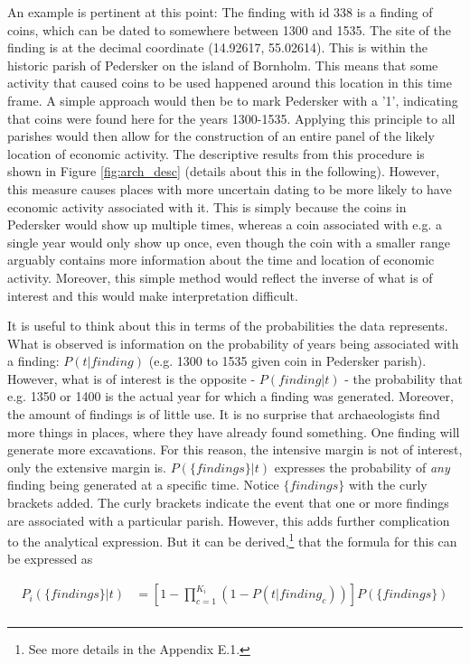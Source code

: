 \documentclass[11pt]{article}
\begin{document}
An example is pertinent at this point: The finding with id 338 is a finding of coins, which can be dated to somewhere between 1300 and 1535. The site of the finding is at the decimal coordinate (14.92617, 55.02614). This is within the historic parish of Pedersker on the island of Bornholm. This means that some activity that caused coins to be used happened around this location in this time frame. A simple approach would then be to mark Pedersker with a '1', indicating that coins were found here for the years 1300-1535. Applying this principle to all parishes would then allow for the construction of an entire panel of the likely location of economic activity. The descriptive results from this procedure is shown in Figure \ref{fig:arch_desc} (details about this in the following). However, this measure causes places with more uncertain dating to be more likely to have economic activity associated with it. This is simply because the coins in Pedersker would show up multiple times, whereas a coin associated with e.g. a single year would only show up once, even though the coin with a smaller range arguably contains more information about the time and location of economic activity. Moreover, this simple method would reflect the inverse of what is of interest and this would make interpretation difficult. 

It is useful to think about this in terms of the probabilities the data represents. What is observed is information on the probability of years being associated with a finding: $P(t|finding)$ (e.g. 1300 to 1535 given coin in Pedersker parish). However, what is of interest is the opposite - $P(finding|t)$ - the probability that e.g. 1350 or 1400 is the actual year for which a finding was generated. Moreover, the amount of findings is of little use. It is no surprise that archaeologists find more things in places, where they have already found something. One finding will generate more excavations. For this reason, the intensive margin is not of interest, only the extensive margin is. $P(\{findings\}|t)$ expresses the probability of \textit{any} finding being generated at a specific time. Notice $\{findings\}$ with the curly brackets added. The curly brackets indicate the event that one or more findings are associated with a particular parish. However, this adds further complication to the analytical expression. But it can be derived,\footnote{See more details in the Appendix E.1.} that the formula for this can be expressed as 

\begin{equation}
\begin{split}
\label{eq:arch1}
P_i(\{findings\}|t)&=\left[1-\prod_{c=1}^{K_i} \left( 1 - P(t|finding_c) \right)\right] P(\{findings\}) \\
\end{split}
\end{equation}
\end{document}
